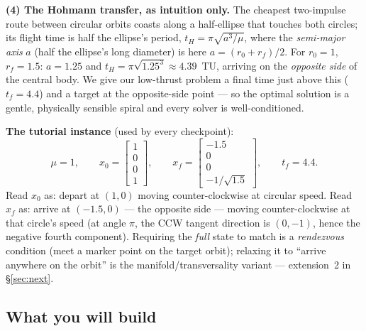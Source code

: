 \documentclass[11pt,letterpaper]{article}
\begin{document}
\textbf{(4) The Hohmann transfer, as intuition only.} The cheapest two-impulse
route between circular orbits coasts along a half-ellipse that touches both
circles; its flight time is half the ellipse's period,
$t_H = \pi\sqrt{a^{3}/\mu}$, where the \emph{semi-major axis} $a$ (half the
ellipse's long diameter) is here $a = (r_0 + r_f)/2$. For $r_0=1$,
$r_f=1.5$: $a = 1.25$ and $t_H = \pi\sqrt{1.25^{3}} \approx 4.39$~TU, arriving
on the \emph{opposite side} of the central body. We give our low-thrust
problem a final time just above this ($t_f = 4.4$) and a target at the
opposite-side point --- so the optimal solution is a gentle, physically
sensible spiral and every solver is well-conditioned.

\textbf{The tutorial instance} (used by every checkpoint):
\[
  \mu = 1,\qquad
  x_0 = \begin{bmatrix}1\\0\\0\\1\end{bmatrix},\qquad
  x_f = \begin{bmatrix}-1.5\\[2pt]0\\[2pt]0\\[2pt]-1/\sqrt{1.5}\end{bmatrix},\qquad
  t_f = 4.4 .
\]
Read $x_0$ as: depart at $(1,0)$ moving counter-clockwise at circular speed.
Read $x_f$ as: arrive at $(-1.5, 0)$ --- the opposite side --- moving
counter-clockwise at that circle's speed (at angle $\pi$, the CCW tangent
direction is $(0,-1)$, hence the negative fourth component). Requiring the
\emph{full} state to match is a \emph{rendezvous} condition (meet a marker
point on the target orbit); relaxing it to ``arrive anywhere on the orbit''
is the manifold/transversality variant --- extension~2 in
\S\ref{sec:next}.

\subsection{What you will build}
\end{document}
